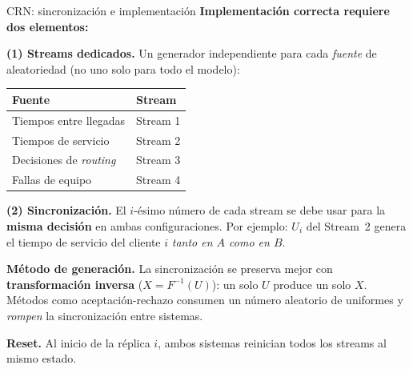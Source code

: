 \documentclass[aspectratio=1610, 10pt]{beamer}
\begin{document}
\begin{frame}{CRN: sincronización e implementación}
\textbf{Implementación correcta requiere dos elementos:}

\vspace{0.2cm}
\textbf{(1) Streams dedicados.} Un generador independiente para cada \emph{fuente} de aleatoriedad (no uno solo para todo el modelo):
\begin{center}
\small
\begin{tabular}{ll}
\toprule
\textbf{Fuente} & \textbf{Stream} \\
\midrule
Tiempos entre llegadas & Stream 1 \\
Tiempos de servicio    & Stream 2 \\
Decisiones de \emph{routing} & Stream 3 \\
Fallas de equipo       & Stream 4 \\
\bottomrule
\end{tabular}
\end{center}

\textbf{(2) Sincronización.} El $i$-ésimo número de cada stream se debe usar para la \textbf{misma decisión} en ambas configuraciones. Por ejemplo: $U_i$ del Stream~2 genera el tiempo de servicio del cliente $i$ \emph{tanto en $A$ como en $B$}.

\vspace{0.3cm}
\textbf{Método de generación.} La sincronización se preserva mejor con \textbf{transformación inversa} ($X = F^{-1}(U)$): un solo $U$ produce un solo $X$. Métodos como aceptación-rechazo consumen un número aleatorio de uniformes y \emph{rompen} la sincronización entre sistemas.

\vspace{0.2cm}
\textbf{Reset.} Al inicio de la réplica $i$, ambos sistemas reinician todos los streams al mismo estado.
\end{frame}
\end{document}
